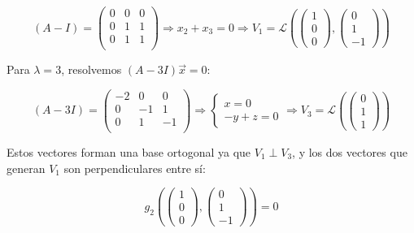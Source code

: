 \documentclass[12pt]{article}
\begin{document}
\begin{ejercicio}[4 puntos]
\begin{enumerate}
			\[
			(A - I) = 
			\begin{pmatrix}
				0 & 0 & 0 \\
				0 & 1 & 1 \\
				0 & 1 & 1 \\
			\end{pmatrix}
			\Rightarrow x_2 + x_3 = 0
			\Rightarrow V_1 = \mathcal{L}\left( \begin{pmatrix} 1 \\ 0 \\ 0 \end{pmatrix}, \begin{pmatrix} 0 \\ 1 \\ -1 \end{pmatrix} \right)
			\]
			
			Para \( \lambda = 3 \), resolvemos \( (A - 3I)\vec{x} = 0 \):
			
			\[
			(A - 3I) = 
			\begin{pmatrix}
				-2 & 0 & 0 \\
				0 & -1 & 1 \\
				0 & 1 & -1 \\
			\end{pmatrix}
			\Rightarrow 
			\left\{
			\begin{array}{l}
				x = 0 \\
				-y + z = 0
			\end{array}
			\right.
			\Rightarrow V_3 = \mathcal{L}\left( \begin{pmatrix} 0 \\ 1 \\ 1 \end{pmatrix} \right)
			\]
			
			\vspace{0.3cm}
			
			Estos vectores forman una base ortogonal ya que \( V_1 \perp V_3 \), y los dos vectores que generan \( V_1 \) son perpendiculares entre sí:
			
			\[
			g_2\left( \begin{pmatrix} 1 \\ 0 \\ 0 \end{pmatrix}, \begin{pmatrix} 0 \\ 1 \\ -1 \end{pmatrix} \right) = 0
			\]
			

\end{enumerate}
\end{ejercicio}
\end{document}
